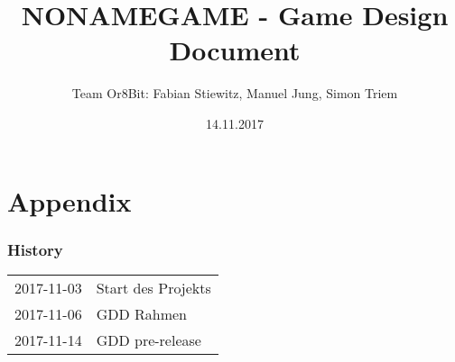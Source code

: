 \documentclass[a4paper,12pt]{article}
\title{NONAMEGAME - Game Design Document}
\author{Team Or8Bit: Fabian Stiewitz, Manuel Jung, Simon Triem}
\date{14.11.2017}
\begin{document}
\maketitle
\newpage
\tableofcontents
\newpage









\appendix
\part{Appendix}

\section{History}
\begin{tabularx}{\textwidth}{ l X }
  2017-11-03 & Start des Projekts \\
  2017-11-06 & GDD Rahmen \\
  2017-11-14 & GDD pre-release \\
\end{tabularx}
\newpage
\printindex
\end{document}
